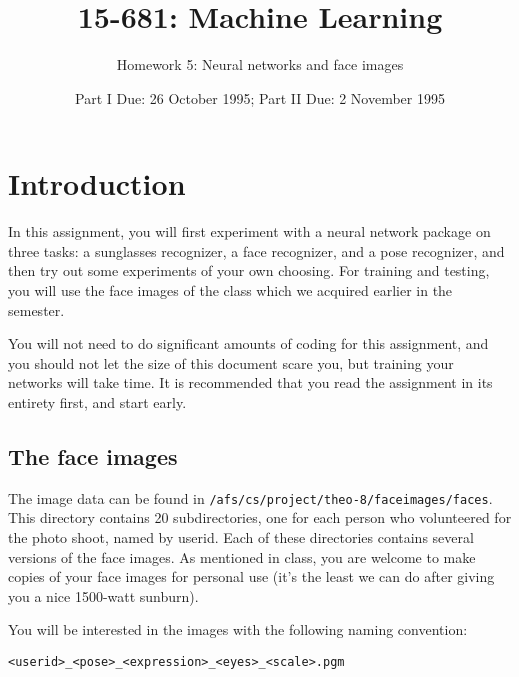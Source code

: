 \def\BOX#1{\fbox{\tt #1}}


\title{15-681: Machine Learning}
\author{Homework 5: Neural networks and face images}
\date{Part I Due: 26 October 1995; Part II Due: 2 November 1995}
\maketitle

\section{Introduction}

In this assignment, you will first experiment with a neural network package
on three tasks: a sunglasses recognizer, a face recognizer, and a pose
recognizer, and then try out some experiments of your own choosing.
For training and testing, you will use the face images
of the class which we acquired earlier in the semester.

You will not need to do significant amounts of coding for this assignment,
and you should not let the size of this document scare you, but training
your networks will take time.  It is recommended that you read the
assignment in its entirety first, and start early.

\subsection{The face images}

The image data can be found in {\tt /afs/cs/project/theo-8/faceimages/faces}.
This directory contains 20 subdirectories, one for each person who
volunteered for the photo shoot, named by userid.  Each of these directories
contains several versions of the face images.  As mentioned in class,
you are welcome to make copies of your face images for personal use
(it's the least we can do after giving you a nice 1500-watt sunburn).

You will be interested in the images with the following naming convention:

{\tt <userid>\_<pose>\_<expression>\_<eyes>\_<scale>.pgm}

